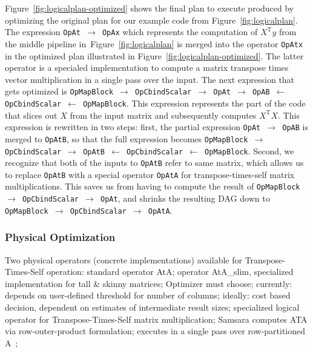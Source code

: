 \documentclass{article}
\begin{document}
Figure~\ref{fig:logicalplan-optimized} shows the final plan to execute produced by optimizing the original plan for our example code from Figure~\ref{fig:logicalplan}. The expression \texttt{OpAt $\rightarrow$ OpAx} which represents the computation of $X^\mathrm{T}y$ from the middle pipeline in~Figure~\ref{fig:logicalplan} is merged into the operator \texttt{OpAtx} in the optimized plan illustrated in Figure~\ref{fig:logicalplan-optimized}. The latter operator is a specialed implementation to compute a matrix transpose times vector multiplication in a single pass over the input. The next expression that gets optimized is \texttt{OpMapBlock $\rightarrow$ OpCbindScalar $\rightarrow$ OpAt $\rightarrow$ OpAB $\leftarrow$ OpCbindScalar $\leftarrow$ OpMapBlock}. This expression represents the part of the code that slices out $X$ from the input matrix and subsequently computes $X^\mathrm{T}X$. This expression is rewritten in two steps: first, the partial expression \texttt{OpAt $\rightarrow$ OpAB} is merged to \texttt{OpAtB}, so that the full expression becomes \texttt{OpMapBlock $\rightarrow$ OpCbindScalar $\rightarrow$ OpAtB $\leftarrow$ OpCbindScalar $\leftarrow$ OpMapBlock}. Second, we recognize that both of the inputs to \texttt{OpAtB} refer to same matrix, which allows us to replace \texttt{OpAtB} with a special operator \texttt{OpAtA} for transpose-times-self matrix multiplications. This saves us from having to compute the result of \texttt{OpMapBlock $\rightarrow$ OpCbindScalar $\rightarrow$ OpAt}, and shrinks the resulting DAG down to \texttt{OpMapBlock $\rightarrow$ OpCbindScalar $\rightarrow$ OpAtA}.

\subsubsection{Physical Optimization}

Two physical operators (concrete implementations) available for Transpose-Times-Self operation: standard operator AtA; operator AtA\_slim, specialized implementation for tall \& skinny matrices; Optimizer must choose; currently: depends on user-defined threshold for number of columns; ideally: cost based decision, dependent on estimates of intermediate result sizes; specialized logical operator for Transpose-Times-Self matrix multiplication; Samsara computes ATA via row-outer-product formulation; executes in a single pass over row-partitioned A~\cite{Schelter2012}; 
\end{document}
